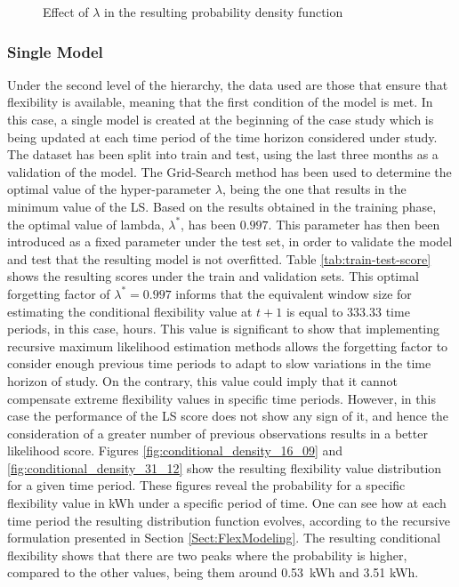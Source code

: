 \begin{figure}[ht!]
\centering     %
{}
\caption{Effect of $\lambda$ in the resulting probability density function}
\label{fig:rml_lambda_effect}
\end{figure}



\subsubsection{Single Model}\label{Sect:ResultsLevel2SingleModel} 

Under the second level of the hierarchy, the data used are those that ensure that flexibility is available, meaning that the first condition of the model is met. In this case, a single model is created at the beginning of the case study which is being updated at each time period of the time horizon considered under study. The dataset has been split into train and test, using the last three months as a validation of the model. The Grid-Search method has been used to determine the optimal value of the hyper-parameter $\lambda$, being the one that results in the minimum value of the LS.  Based on the results obtained in the training phase, the optimal value of lambda, $\lambda^{*}$, has been $0.997$. This parameter has then been introduced as a fixed parameter under the test set, in order to validate the model and test that the resulting model is not overfitted. Table \ref{tab:train-test-score} shows the resulting scores under the train and validation sets. This optimal forgetting factor of $\lambda^{*} = 0.997$ informs that the equivalent window size for estimating the conditional flexibility value at $t+1$ is equal to 333.33 time periods, in this case, hours. This value is significant to show that implementing recursive maximum likelihood estimation methods allows the forgetting factor to consider enough previous time periods to adapt to slow variations in the time horizon of study. On the contrary, this value could imply that it cannot compensate extreme flexibility values in specific time periods. However, in this case the performance of the LS score does not show any sign of it, and hence the consideration of a greater number of previous observations results in a better likelihood score. 
Figures \ref{fig:conditional_density_16_09} and \ref{fig:conditional_density_31_12} show the resulting flexibility value distribution for a given time period. These figures reveal the probability for a specific flexibility value in kWh under a specific period of time. One can see how at each time period the resulting distribution function evolves, according to the recursive formulation presented in Section \ref{Sect:FlexModeling}. The resulting conditional flexibility shows that there are two peaks where the probability is higher, compared to the other values, being them around 0.53~kWh and 3.51 kWh. 


